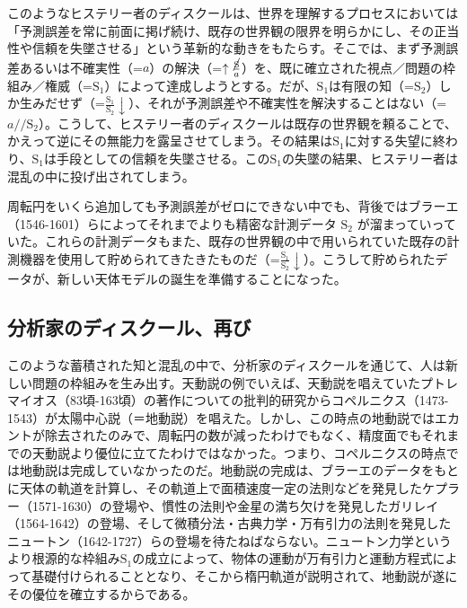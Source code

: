 このようなヒステリー者のディスクールは、世界を理解するプロセスにおいては「予測誤差を常に前面に掲げ続け、既存の世界観の限界を明らかにし、その正当性や信頼を失墜させる」という革新的な動きをもたらす。そこでは、まず予測誤差あるいは不確実性（=\(a\)）の解決（=\(\uparrow\frac{\cancel{\textrm{S}}}{a}\)）を、既に確立された視点／問題の枠組み／権威（=\(\textrm{S}_1\)）によって達成しようとする。だが、\(\textrm{S}_1\)は有限の知（=\(\textrm{S}_2\)）しか生みだせず（=\(\frac{\textrm{S}_1}{\textrm{S}_2}\downarrow\)）、それが予測誤差や不確実性を解決することはない（=\(a//\textrm{S}_2\)）。こうして、ヒステリー者のディスクールは既存の世界観を頼ることで、かえって逆にその無能力を露呈させてしまう。その結果は\(\textrm{S}_1\)に対する失望に終わり、\(\textrm{S}_1\)は手段としての信頼を失墜させる。この\(\textrm{S}_1\)の失墜の結果、ヒステリー者は混乱の中に投げ出されてしまう。

周転円をいくら追加しても予測誤差がゼロにできない中でも、背後ではブラーエ（1546-1601）らによってそれまでよりも精密な計測データ
\(\textrm{S}_2\)
が溜まっていっていた。これらの計測データもまた、既存の世界観の中で用いられていた既存の計測機器を使用して貯められてきたきたものだ（=\(\frac{\textrm{S}_1}{\textrm{S}_2}\downarrow\)）。こうして貯められたデータが、新しい天体モデルの誕生を準備することになった。

\subsection{分析家のディスクール、再び}\label{ux5206ux6790ux5bb6ux306eux30c7ux30a3ux30b9ux30afux30fcux30ebux518dux3073}

このような蓄積された知と混乱の中で、分析家のディスクールを通じて、人は新しい問題の枠組みを生み出す。天動説の例でいえば、天動説を唱えていたプトレマイオス（83頃-163頃）の著作についての批判的研究からコペルニクス（1473-1543）が太陽中心説（＝地動説）を唱えた。しかし、この時点の地動説ではエカントが除去されたのみで、周転円の数が減ったわけでもなく、精度面でもそれまでの天動説より優位に立てたわけではなかった。つまり、コペルニクスの時点では地動説は完成していなかったのだ。地動説の完成は、ブラーエのデータをもとに天体の軌道を計算し、その軌道上で面積速度一定の法則などを発見したケプラー（1571-1630）の登場や、慣性の法則や金星の満ち欠けを発見したガリレイ（1564-1642）の登場、そして微積分法・古典力学・万有引力の法則を発見したニュートン（1642-1727）らの登場を待たねばならない。ニュートン力学というより根源的な枠組み\(\textrm{S}_1\)の成立によって、物体の運動が万有引力と運動方程式によって基礎付けられることとなり、そこから楕円軌道が説明されて、地動説が遂にその優位を確立するからである。

